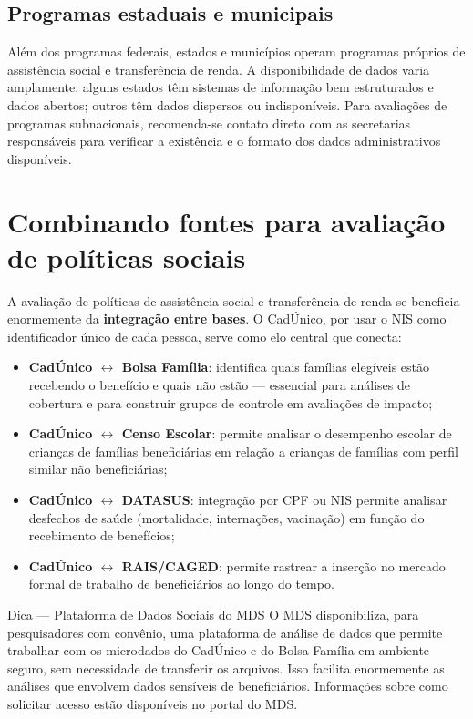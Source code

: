 \subsection{Programas estaduais e municipais}

Além dos programas federais, estados e municípios operam programas próprios de assistência social e transferência de renda. A disponibilidade de dados varia amplamente: alguns estados têm sistemas de informação bem estruturados e dados abertos; outros têm dados dispersos ou indisponíveis. Para avaliações de programas subnacionais, recomenda-se contato direto com as secretarias responsáveis para verificar a existência e o formato dos dados administrativos disponíveis.

\section{Combinando fontes para avaliação de políticas sociais}

A avaliação de políticas de assistência social e transferência de renda se beneficia enormemente da \textbf{integração entre bases}. O CadÚnico, por usar o NIS como identificador único de cada pessoa, serve como elo central que conecta:

\begin{itemize}
  \item \textbf{CadÚnico $\leftrightarrow$ Bolsa Família}: identifica quais famílias elegíveis estão recebendo o benefício e quais não estão — essencial para análises de cobertura e para construir grupos de controle em avaliações de impacto;
  \item \textbf{CadÚnico $\leftrightarrow$ Censo Escolar}: permite analisar o desempenho escolar de crianças de famílias beneficiárias em relação a crianças de famílias com perfil similar não beneficiárias;
  \item \textbf{CadÚnico $\leftrightarrow$ DATASUS}: integração por CPF ou NIS permite analisar desfechos de saúde (mortalidade, internações, vacinação) em função do recebimento de benefícios;
  \item \textbf{CadÚnico $\leftrightarrow$ RAIS/CAGED}: permite rastrear a inserção no mercado formal de trabalho de beneficiários ao longo do tempo.
\end{itemize}

\begin{boxdica}{Dica — Plataforma de Dados Sociais do MDS}
O MDS disponibiliza, para pesquisadores com convênio, uma plataforma de análise de dados que permite trabalhar com os microdados do CadÚnico e do Bolsa Família em ambiente seguro, sem necessidade de transferir os arquivos. Isso facilita enormemente as análises que envolvem dados sensíveis de beneficiários. Informações sobre como solicitar acesso estão disponíveis no portal do MDS.
\end{boxdica}

